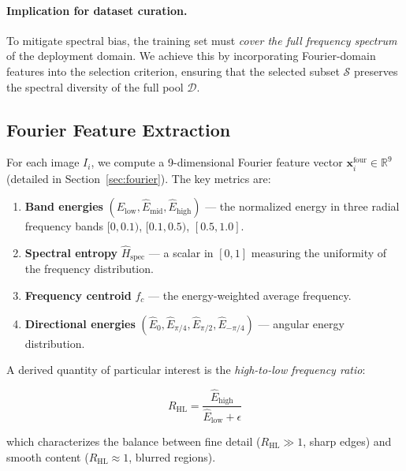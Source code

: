 \paragraph{Implication for dataset curation.}
To mitigate spectral bias, the training set must \emph{cover the full
frequency spectrum} of the deployment domain.  We achieve this by
incorporating Fourier-domain features into the selection criterion, ensuring
that the selected subset $\mathcal{S}$ preserves the spectral diversity of the
full pool $\mathcal{D}$.


\subsection{Fourier Feature Extraction}
\label{sec:fourier_extraction}

For each image $I_i$, we compute a 9-dimensional Fourier feature vector
$\mathbf{x}_i^{\text{four}} \in \mathbb{R}^9$ (detailed in
Section~\ref{sec:fourier}).  The key metrics are:

\begin{enumerate}
    \item \textbf{Band energies} $(\hat{E}_{\text{low}}, \hat{E}_{\text{mid}},
          \hat{E}_{\text{high}})$ --- the normalized energy in three radial
          frequency bands $[0, 0.1)$, $[0.1, 0.5)$, $[0.5, 1.0]$.
    \item \textbf{Spectral entropy} $\hat{H}_{\text{spec}}$ --- a scalar in
          $[0, 1]$ measuring the uniformity of the frequency distribution.
    \item \textbf{Frequency centroid} $f_c$ --- the energy-weighted average
          frequency.
    \item \textbf{Directional energies} $(\hat{E}_0, \hat{E}_{\pi/4},
          \hat{E}_{\pi/2}, \hat{E}_{-\pi/4})$ --- angular energy distribution.
\end{enumerate}

A derived quantity of particular interest is the \emph{high-to-low frequency
ratio}:

\begin{equation}
    R_{\text{HL}} = \frac{\hat{E}_{\text{high}}}{\hat{E}_{\text{low}} + \epsilon}
    \label{eq:hl_ratio}
\end{equation}

which characterizes the balance between fine detail ($R_{\text{HL}} \gg 1$,
sharp edges) and smooth content ($R_{\text{HL}} \approx 1$, blurred regions).


